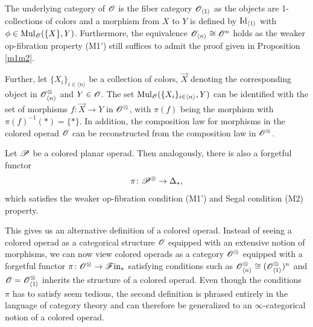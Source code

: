 The underlying category of $\O$ is the fiber category $\O_{\langle 1 \rangle}$
as the objects are 1-collections of colors and a morphism from $X$ to $Y$ is
defined by $\id_{\langle 1 \rangle}$ with $\phi \in \Mul_{\O}(\{X\}, Y)$.
Furthermore, the equivalence $\O_{\langle n \rangle} \cong \O^n$ holds as the
weaker op-fibration property (M1') still suffices to admit the proof given in
Proposition \ref{m1m2}. 

Further, let $\{X_i\}_{i \in \langle n \rangle}$ be a collection of colors,
$\Vec{X}$ denoting the corresponding object in $\Ox_{\langle n \rangle}$ and $Y
\in \O$. The set $\Mul_{\O}(\{X_i\}_{i \in \langle n \rangle}, Y)$ can be
identified with the set of morphisms $f \colon \Vec{X} \to Y$ in $\Ox$, with
$\pi(f)$ being the morphism with $\pi(f)^{-1} (\ast)= \{ \ast \}$. In addition,
the composition law for morphisms in the colored operad $\O$ can be
reconstructed from the composition law in $\Ox$.

\begin{rem}
    Let $\P$ be a colored planar operad. Then analogously, there is also a
    forgetful functor
    \[
        \pi \colon \P^{\otimes} \to \deltast,
    \]
    which satisfies the weaker op-fibration condition (M1') and Segal condition
    (M2) property.
\end{rem}


This gives us an alternative definition of a colored operad. Instead of seeing a
colored operad as a categorical structure $\O$ equipped with an extensive notion
of morphisms, we can now view colored operads as a category $\Ox$ equipped with
a forgetful functor $\pi \colon \Ox \to \Fin$ satisfying conditions such as
$\Ox_{\langle n \rangle} \cong (\Ox_{\langle 1 \rangle})^n$ and $\O =
\Ox_{\langle 1 \rangle}$ inherits the structure of a colored operad. Even though
the conditions $\pi$ has to satisfy seem tedious, the second definition is
phrased entirely in the language of category theory and can therefore be
generalized to an $\infty$-categorical notion of a colored operad. 



